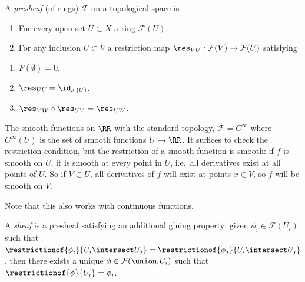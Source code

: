 \begin{definition}[Presheaf]

A \emph{presheaf} (of rings) \(\mathcal{F}\) on a topological space is

\begin{enumerate}
\def\labelenumi{\arabic{enumi}.}
\item
  For every open set \(U\subset X\) a ring \(\mathcal{F}(U)\).
\item
  For any inclusion \(U\subset V\) a restriction map
  \(\res_{VU}: \mathcal{F}(V) \to \mathcal{F}(U)\) satisfying
\end{enumerate}

\begin{enumerate}
\def\labelenumi{\alph{enumi}.}
\tightlist
\item
  \(F(\emptyset) = 0\).
\item
  \(\res_{UU} = \id_{\mathcal{F}(U)}\).
\item
  \(\res_{VW} \circ \res_{UV} = \res_{UW}\).
\end{enumerate}

\end{definition}

\begin{example}

The smooth functions on \(\RR\) with the standard topology,
\(\mathcal{F} = C^\infty\) where \(C^\infty(U)\) is the set of smooth
functions \(U\to \RR\). It suffices to check the restriction condition,
but the restriction of a smooth function is smooth: if \(f\) is smooth
on \(U\), it is smooth at every point in \(U\), i.e.~all derivatives
exist at all points of \(U\). So if \(V\subset U\), all derivatives of
\(f\) will exist at points \(x \in V\), so \(f\) will be smooth on
\(V\).

Note that this also works with continuous functions.

\end{example}

\begin{definition}[Sheaf]

A \emph{sheaf} is a presheaf satisfying an additional gluing property:
given \(\phi_i \in \mathcal{F}(U_i)\) such that
\(\restrictionof{\phi_i}{U_i\intersect U_j} = \restrictionof{\phi_j}{U_i \intersect U_j}\),
then there exists a unique \(\phi\in \mathcal{F}(\union_i U_i)\) such
that \(\restrictionof{\phi}{U_i} = \phi_i\).

\end{definition}

